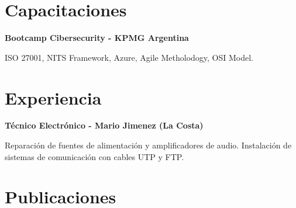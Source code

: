 \begin{adjustbox}{valign=t}
\begin{minipage}{0.60\textwidth}
\begin{description}
\end{description}
\section*{Capacitaciones}
\begin{description}
\raggedright

\item[ \textcolor{ColorOne}{Nov.2021}] 
	\textbf{Bootcamp Cibersecurity - KPMG Argentina} \Myskip
    \item ISO 27001, NITS Framework, Azure, Agile Metholodogy, OSI Model.\MySkip
\end{description}


\section*{Experiencia}
\begin{description}
\raggedright

\item[ \textcolor{ColorOne}{2015-2019}] 
	\textbf{Técnico Electrónico - Mario Jimenez (La Costa)}\\ \Myskip
	\item	Reparación de fuentes de alimentación y amplificadores de audio. Instalación de sistemas de comunicación con cables UTP y FTP. \MySkip	 	
\end{description}
\section*{Publicaciones}
\begin{description}
\raggedright


\end{description}
\end{minipage}
\end{adjustbox}
